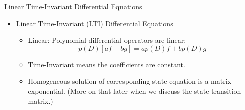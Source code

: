 \begin{frame}
Linear Time-Invariant Differential Equations
 \begin{itemize}
 \item Linear Time-Invariant (LTI) Differential Equations
 \begin{itemize}
 \item Linear: Polynomial differential operators are linear:
\[p(D)[af+bg]= ap(D)f+bp(D)g\]
 \item Time-Invariant means the coefficients are constant.
 \item Homogeneous solution of corresponding state equation is a matrix exponential.  (More on that later when we discuss the state transition matrix.)
\end{itemize}
\end{itemize}
\end{frame}
